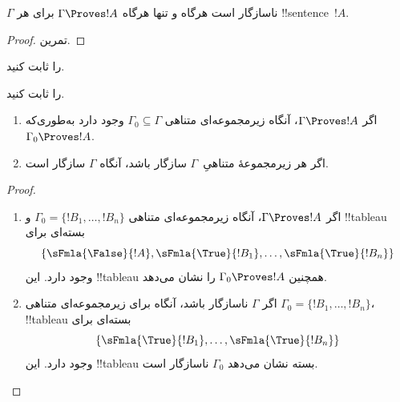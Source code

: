 \documentclass[../../../include/open-logic-section]{subfiles}
\begin{document}
\begin{prop}
$\Gamma$ ناسازگار است هرگاه و تنها هرگاه $\Gamma \Proves !A$ برای هر
  !!{sentence}~$!A$.
\end{prop}

\begin{proof}
تمرین.
\end{proof}

\begin{prob}
 را ثابت کنید.
\end{prob}
\tagendprob

\begin{prob}
 را ثابت کنید.
\end{prob}
\tagendprob

\begin{prop}[فشردگی]
  \begin{enumerate}
  \item اگر $\Gamma \Proves !A$، آنگاه زیرمجموعه‌ای متناهی
    $\Gamma_0 \subseteq \Gamma$ وجود دارد به‌طوری‌که
    $\Gamma_0 \Proves !A$.
  \item اگر هر زیرمجموعهٔ متناهیِ~$\Gamma$ سازگار باشد، آنگاه
    $\Gamma$ سازگار است.
  \end{enumerate}
\end{prop}

\begin{proof}
  \begin{enumerate}
    \item اگر $\Gamma \Proves !A$، آنگاه زیرمجموعه‌ای متناهی
      $\Gamma_0 = \{!B_1, \dots, !B_n\}$ و !!{tableau} بسته‌ای برای
      \[
      \{\sFmla{\False}{!A}, \sFmla{\True}{!B_1}, \dots, \sFmla{\True}{!B_n}\}
      \]
      وجود دارد. این !!{tableau} همچنین $\Gamma_0 \Proves !A$ را نشان
      می‌دهد.
    \item اگر $\Gamma$ ناسازگار باشد، آنگاه برای زیرمجموعه‌ای متناهی
      $\Gamma_0 = \{!B_1, \dots, !B_n\}$، !!{tableau} بسته‌ای برای
      \[
      \{\sFmla{\True}{!B_1}, \dots, \sFmla{\True}{!B_n}\}
      \]
      وجود دارد. این !!{tableau} بسته نشان می‌دهد $\Gamma_0$ ناسازگار است.
  \end{enumerate}
\end{proof}
\end{document}
